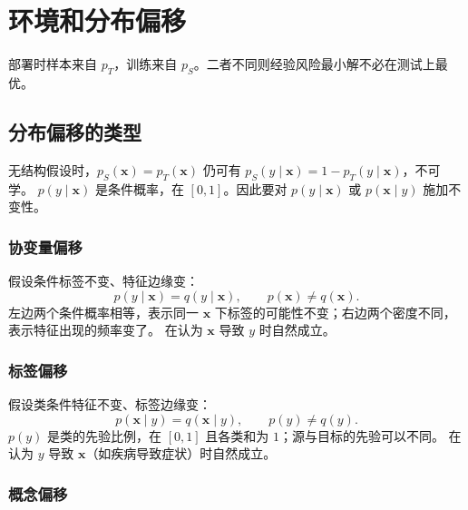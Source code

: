 \section{环境和分布偏移}





部署时样本来自 $p_{T}$，训练来自 $p_{S}$。二者不同则经验风险最小解不必在测试上最优。

\subsection{分布偏移的类型}

无结构假设时，$p_{S}(\bm{x})=p_{T}(\bm{x})$ 仍可有 $p_{S}(y\mid\bm{x})=1-p_{T}(y\mid\bm{x})$，不可学。
$p(y\mid\bm{x})$ 是条件概率，在 $[0,1]$。因此要对 $p(y\mid\bm{x})$ 或 $p(\bm{x}\mid y)$ 施加不变性。

\subsubsection{协变量偏移}

假设条件标签不变、特征边缘变：
\[
p(y\mid\bm{x})=q(y\mid\bm{x}),\qquad p(\bm{x})\neq q(\bm{x}).
\]
左边两个条件概率相等，表示同一 $\bm{x}$ 下标签的可能性不变；右边两个密度不同，表示特征出现的频率变了。
在认为 $\bm{x}$ 导致 $y$ 时自然成立。

\subsubsection{标签偏移}

假设类条件特征不变、标签边缘变：
\[
p(\bm{x}\mid y)=q(\bm{x}\mid y),\qquad p(y)\neq q(y).
\]
$p(y)$ 是类的先验比例，在 $[0,1]$ 且各类和为 $1$；源与目标的先验可以不同。
在认为 $y$ 导致 $\bm{x}$（如疾病导致症状）时自然成立。

\subsubsection{概念偏移}

